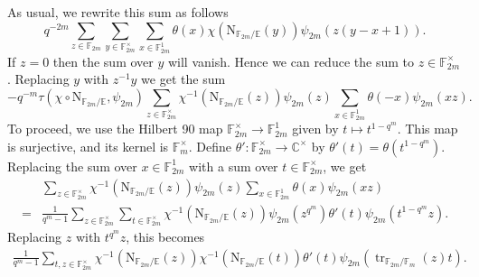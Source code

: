 \documentclass[12pt, reqno]{amsart}
\theoremstyle{definition}
\theoremstyle{definition}
\theoremstyle{definition}
\newcommand{\cComplex}{\mathbb{C}}
\newcommand{\multiplicativegroup}[1]{#1^{\times}}
\newcommand{\fieldCharacter}{\psi}
\newcommand{\trace}{\operatorname{tr}}
\newcommand{\aFieldNorm}{\mathrm{N}}
\newcommand{\finiteField}{\mathbb{F}}
\newcommand{\quadraticExtension}{\mathbb{E}}
\newcommand{\finiteFieldExtension}[1]{\finiteField_{#1}}
\begin{document}
As usual, we rewrite this sum as follows
$$q^{-2m} \sum_{z \in \finiteFieldExtension{2m}} \sum_{y \in \multiplicativegroup{\finiteFieldExtension{2m}}} \sum_{x \in \finiteFieldExtension{2m}^1} \theta \left(x\right) \chi\left(\aFieldNorm_{\finiteFieldExtension{2m} \slash \quadraticExtension}\left(y\right)\right) \fieldCharacter_{2m}\left(z\left(y-x+1\right)\right).$$
If $z=0$ then the sum over $y$ will vanish. Hence we can reduce the sum to $z \in \multiplicativegroup{\finiteFieldExtension{2m}}$. Replacing $y$ with $z^{-1} y$ we get the sum
$$-q^{-m} \tau\left(\chi \circ \aFieldNorm_{\finiteFieldExtension{2m} \slash \quadraticExtension}, \fieldCharacter_{2m}\right) \sum_{z \in \multiplicativegroup{\finiteFieldExtension{2m}}} \chi^{-1}\left(\aFieldNorm_{\finiteFieldExtension{2m} \slash \quadraticExtension}\left(z\right)\right) \fieldCharacter_{2m}\left(z\right)  \sum_{x \in \finiteFieldExtension{2m}^1} \theta \left(-x\right) \fieldCharacter_{2m}\left(xz\right).$$
To proceed, we use the Hilbert 90 map $\multiplicativegroup{\finiteFieldExtension{2m}} \to \finiteFieldExtension{2m}^1$ given by $t \mapsto t^{1 - q^m}$. This map is surjective, and its kernel is $\multiplicativegroup{\finiteFieldExtension{m}}$. Define $\theta' \colon \multiplicativegroup{\finiteFieldExtension{2m}} \to \multiplicativegroup{\cComplex}$ by $\theta'\left(t\right) = \theta\left(t^{1-q^m}\right)$. Replacing the sum over $x \in \finiteFieldExtension{2m}^1$ with a sum over $t \in \multiplicativegroup{\finiteFieldExtension{2m}}$, we get \begin{align*}
	& \sum_{z \in \multiplicativegroup{\finiteFieldExtension{2m}}} \chi^{-1}\left(\aFieldNorm_{\finiteFieldExtension{2m} \slash \quadraticExtension}\left(z\right)\right) \fieldCharacter_{2m}\left(z\right) \sum_{x \in \finiteFieldExtension{2m}^1} \theta \left(x\right) \fieldCharacter_{2m}\left(xz\right) \\
	= & \frac{1}{q^m-1}\sum_{z \in \multiplicativegroup{\finiteFieldExtension{2m}}} \sum_{t \in \multiplicativegroup{\finiteFieldExtension{2m}}} \chi^{-1}\left(\aFieldNorm_{\finiteFieldExtension{2m} \slash \quadraticExtension}\left(z\right)\right) \fieldCharacter_{2m}\left(z^{q^m}\right) \theta' \left(t\right) \fieldCharacter_{2m}\left(t^{1-q^m} z\right).
\end{align*}
Replacing $z$ with $t^{q^m} z$, this becomes
\begin{align*}
	\frac{1}{q^m-1}\sum_{t,z \in \multiplicativegroup{\finiteFieldExtension{2m}}} \chi^{-1}\left(\aFieldNorm_{\finiteFieldExtension{2m} \slash \quadraticExtension}\left(z\right)\right) \chi^{-1}\left(\aFieldNorm_{\finiteFieldExtension{2m} \slash \quadraticExtension}\left(t\right)\right) \theta' \left(t\right) \fieldCharacter_{2m}\left(\trace_{\finiteFieldExtension{2m} \slash \finiteFieldExtension{m}}\left(z\right) t\right).
\end{align*}
\end{document}
